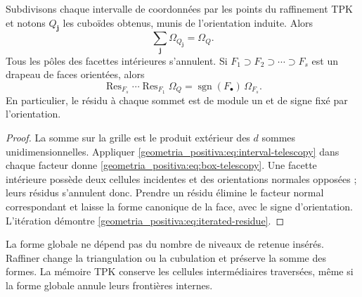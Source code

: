 \begin{theorem}
\label{geometria_positiva:thm:tpk-higher-residues} Subdivisons chaque intervalle de coordonnées par les points du raffinement TPK et notons \(Q_{\mathbf j}\) les cuboïdes obtenus, munis de l’orientation induite. Alors
\begin{equation}
 \boxed{\displaystyle
 \sum_{\mathbf j}\Omega_{Q_{\mathbf j}}=\Omega_Q.}
 \label{geometria_positiva:eq:box-telescopy}
\end{equation}
Tous les pôles des facettes intérieures s’annulent. Si \(F_1\supset F_2\supset\cdots\supset F_s\) est un drapeau de faces orientées, alors
\begin{equation}
 \operatorname{Res}_{F_s}\cdots\operatorname{Res}_{F_1}\Omega_Q
 =\operatorname{sgn}(F_\bullet)\,\Omega_{F_s}.
 \label{geometria_positiva:eq:iterated-residue}
\end{equation}
En particulier, le résidu à chaque sommet est de module un et de signe fixé par l’orientation.
\end{theorem}
\begin{proof}
La somme sur la grille est le produit extérieur des \(d\) sommes unidimensionnelles. Appliquer \eqref{geometria_positiva:eq:interval-telescopy} dans chaque facteur donne \eqref{geometria_positiva:eq:box-telescopy}. Une facette intérieure possède deux cellules incidentes et des orientations normales opposées ; leurs résidus s’annulent donc. Prendre un résidu élimine le facteur normal correspondant et laisse la forme canonique de la face, avec le signe d’orientation. L’itération démontre \eqref{geometria_positiva:eq:iterated-residue}.
\end{proof}

\begin{corollary}
La forme globale ne dépend pas du nombre de niveaux de retenue insérés. Raffiner change la triangulation ou la cubulation et préserve la somme des formes. La mémoire TPK conserve les cellules intermédiaires traversées, même si la forme globale annule leurs frontières internes.
\end{corollary}

